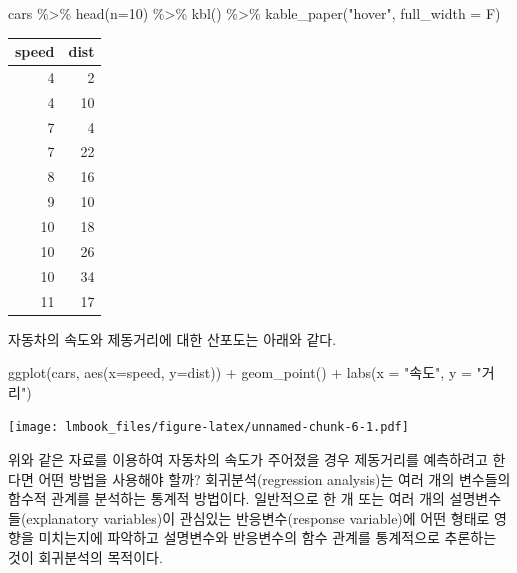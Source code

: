 \documentclass[
]{book}
\newenvironment{Shaded}{\begin{snugshade}}{\end{snugshade}}
\newcommand{\AttributeTok}[1]{\textcolor[rgb]{0.77,0.63,0.00}{#1}}
\newcommand{\DecValTok}[1]{\textcolor[rgb]{0.00,0.00,0.81}{#1}}
\newcommand{\FunctionTok}[1]{\textcolor[rgb]{0.00,0.00,0.00}{#1}}
\newcommand{\NormalTok}[1]{#1}
\newcommand{\SpecialCharTok}[1]{\textcolor[rgb]{0.00,0.00,0.00}{#1}}
\newcommand{\StringTok}[1]{\textcolor[rgb]{0.31,0.60,0.02}{#1}}
\theoremstyle{definition}
\theoremstyle{definition}
\theoremstyle{definition}
\theoremstyle{remark}
\begin{document}
\begin{Shaded}
\begin{Highlighting}[]
\NormalTok{cars }\SpecialCharTok{\%\textgreater{}\%} \FunctionTok{head}\NormalTok{(}\AttributeTok{n=}\DecValTok{10}\NormalTok{) }\SpecialCharTok{\%\textgreater{}\%} \FunctionTok{kbl}\NormalTok{() }\SpecialCharTok{\%\textgreater{}\%}  \FunctionTok{kable\_paper}\NormalTok{(}\StringTok{"hover"}\NormalTok{, }\AttributeTok{full\_width =}\NormalTok{ F)}
\end{Highlighting}
\end{Shaded}

\begin{table}
\centering
\begin{tabular}[t]{r|r}
\hline
speed & dist\\
\hline
4 & 2\\
\hline
4 & 10\\
\hline
7 & 4\\
\hline
7 & 22\\
\hline
8 & 16\\
\hline
9 & 10\\
\hline
10 & 18\\
\hline
10 & 26\\
\hline
10 & 34\\
\hline
11 & 17\\
\hline
\end{tabular}
\end{table}

자동차의 속도와 제동거리에 대한 산포도는 아래와 같다.

\begin{Shaded}
\begin{Highlighting}[]
\FunctionTok{ggplot}\NormalTok{(cars, }\FunctionTok{aes}\NormalTok{(}\AttributeTok{x=}\NormalTok{speed, }\AttributeTok{y=}\NormalTok{dist)) }\SpecialCharTok{+} \FunctionTok{geom\_point}\NormalTok{() }\SpecialCharTok{+} \FunctionTok{labs}\NormalTok{(}\AttributeTok{x =} \StringTok{"속도"}\NormalTok{, }\AttributeTok{y =} \StringTok{"거리"}\NormalTok{)}
\end{Highlighting}
\end{Shaded}

\texttt{[image: lmbook\_files/figure-latex/unnamed-chunk-6-1.pdf]}

위와 같은 자료를 이용하여 자동차의 속도가 주어졌을 경우 제동거리를
예측하려고 한다면 어떤 방법을 사용해야 할까? 회귀분석(regression
analysis)는 여러 개의 변수들의 함수적 관계를 분석하는 통계적 방법이다.
일반적으로 한 개 또는 여러 개의 설명변수들(explanatory variables)이
관심있는 반응변수(response variable)에 어떤 형태로 영향을 미치는지에
파악하고 설명변수와 반응변수의 함수 관계를 통계적으로 추론하는 것이
회귀분석의 목적이다.
\end{document}
